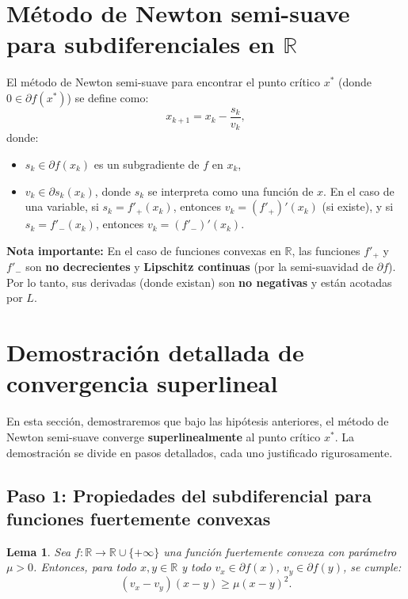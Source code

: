 \documentclass[12pt]{book}
\newtheorem{lemma}{Lema}
\theoremstyle{definition}
\theoremstyle{plain}
\theoremstyle{remark}
\begin{document}
\section*{Método de Newton semi-suave para subdiferenciales en \( \mathbb{R} \)}

El método de Newton semi-suave para encontrar el punto crítico \( x^* \) (donde \( 0 \in \partial f(x^*) \)) se define como:
\[
x_{k+1} = x_k - \frac{s_k}{v_k},
\]
donde:
\begin{itemize}
    \item \( s_k \in \partial f(x_k) \) es un subgradiente de \( f \) en \( x_k \),
    \item \( v_k \in \partial s_k(x_k) \), donde \( s_k \) se interpreta como una función de \( x \). En el caso de una variable, si \( s_k = f'_+(x_k) \), entonces \( v_k = (f'_+)' (x_k) \) (si existe), y si \( s_k = f'_-(x_k) \), entonces \( v_k = (f'_-)' (x_k) \).
\end{itemize}

\medskip
\textbf{Nota importante:}
En el caso de funciones convexas en \( \mathbb{R} \), las funciones \( f'_+ \) y \( f'_- \) son \textbf{no decrecientes} y \textbf{Lipschitz continuas} (por la semi-suavidad de \( \partial f \)). Por lo tanto, sus derivadas (donde existan) son \textbf{no negativas} y están acotadas por \( L \).

\section*{Demostración detallada de convergencia superlineal}

En esta sección, demostraremos que bajo las hipótesis anteriores, el método de Newton semi-suave converge \textbf{superlinealmente} al punto crítico \( x^* \). La demostración se divide en pasos detallados, cada uno justificado rigurosamente.

\subsection*{Paso 1: Propiedades del subdiferencial para funciones fuertemente convexas}

\begin{lemma}
Sea \( f: \mathbb{R} \to \mathbb{R} \cup \{+\infty\} \) una función fuertemente convexa con parámetro \( \mu > 0 \). Entonces, para todo \( x, y \in \mathbb{R} \) y todo \( v_x \in \partial f(x) \), \( v_y \in \partial f(y) \), se cumple:
\[
(v_x - v_y)(x - y) \geq \mu (x - y)^2.
\]
\end{lemma}
\end{document}

